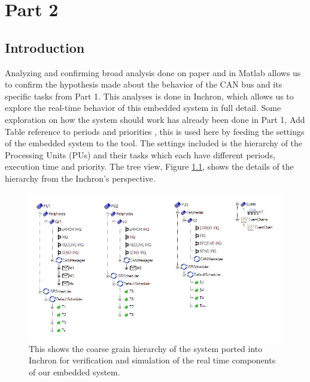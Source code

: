 \chapter{Part 2}


\section{Introduction}

Analyzing and confirming broad analysis done on paper and in Matlab allows us to confirm the hypothesis made about the behavior of the CAN bus and its specific tasks from Part 1. This analyses is done in Inchron, which allows us to explore the real-time behavior of this embedded system in full detail. Some exploration on how the system should work has already been done in Part 1, \color{red} Add Table reference to periods and priorities \color{black}, this is used here by feeding the settings of the embedded system to the tool. The settings included is the hierarchy of the Processing Units (PUs) and their tasks which each have different periods, execution time and priority. The tree view, Figure \ref{fig:treeCAN}, shows the details of the hierarchy from the Inchron's perspective.

\begin{figure}[h!]
	\begin{center}
		\includegraphics[width=0.9\linewidth]{img/treeCAN}
		\caption{This shows the coarse grain hierarchy of the system ported into Inchron for verification and simulation of the real time components of our embedded system.}
		\label{fig:treeCAN}
	\end{center}
\end{figure}





